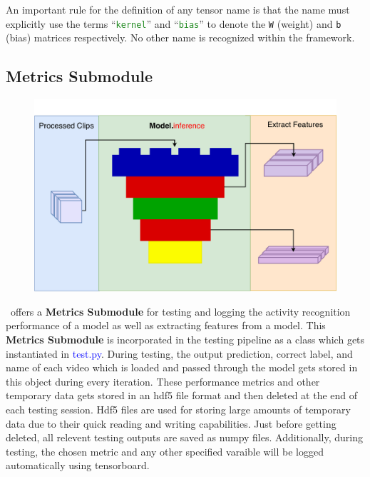 \documentclass{llncs}
\begin{document}
An important rule for the definition of any tensor name is that the name must explicitly use the terms ``\texttt{\textcolor{ForestGreen}{kernel}}'' and ``\texttt{\textcolor{ForestGreen}{bias}}'' to denote the \texttt{W} (weight) and \texttt{b} (bias) matrices respectively.
No other name is recognized within the framework.



\subsection{Metrics Submodule}
\label{sec:metrics}

\begin{figure}[t!]
\centering
\includegraphics[width=0.7\columnwidth]{images/extract_features.pdf}
\caption{}
\label{fig:extract_features}
\end{figure}

\acro~offers a \textbf{Metrics Submodule} for testing and logging the activity recognition performance of a model as well as extracting features from a model.
This \textbf{Metrics Submodule} is incorporated in the testing pipeline as a class which gets instantiated in \textcolor{blue}{test.py}.
During testing, the output prediction, correct label, and name of each video which is loaded and passed through the model gets stored in this object during every iteration.
These performance metrics and other temporary data gets stored in an hdf5 file format and then deleted at the end of each testing session.
Hdf5 files are used for storing large amounts of temporary data due to their quick reading and writing capabilities.
Just before getting deleted, all relevent testing outputs are saved as numpy files.
Additionally, during testing, the chosen metric and any other specified varaible will be logged automatically using tensorboard.
\end{document}
